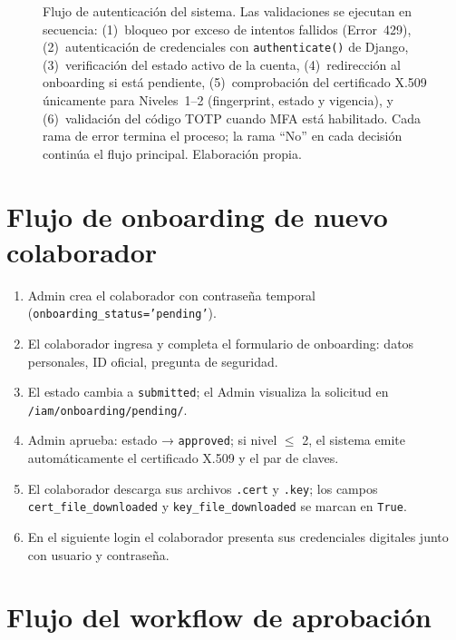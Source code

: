 \documentclass[10pt,letterpaper]{report}
\begin{document}
\begin{figure}[H]
\caption{Flujo de autenticación del sistema. Las validaciones se ejecutan en secuencia: (1)~bloqueo por exceso de intentos fallidos (Error~429), (2)~autenticación de credenciales con \texttt{authenticate()} de Django, (3)~verificación del estado activo de la cuenta, (4)~redirección al onboarding si está pendiente, (5)~comprobación del certificado X.509 únicamente para Niveles~1--2 (fingerprint, estado y vigencia), y (6)~validación del código TOTP cuando MFA está habilitado. Cada rama de error termina el proceso; la rama ``No'' en cada decisión continúa el flujo principal. Elaboración propia.}
\label{fig:flujo_login}
\end{figure}

\section{Flujo de onboarding de nuevo colaborador}

\begin{enumerate}[leftmargin=*]
    \item Admin crea el colaborador con contraseña temporal (\texttt{onboarding\_status='pending'}).
    \item El colaborador ingresa y completa el formulario de onboarding: datos personales, ID oficial, pregunta de seguridad.
    \item El estado cambia a \texttt{submitted}; el Admin visualiza la solicitud en \texttt{/iam/onboarding/pending/}.
    \item Admin aprueba: estado → \texttt{approved}; si nivel $\leq$ 2, el sistema emite automáticamente el certificado X.509 y el par de claves.
    \item El colaborador descarga sus archivos \texttt{.cert} y \texttt{.key}; los campos \texttt{cert\_file\_downloaded} y \texttt{key\_file\_downloaded} se marcan en \texttt{True}.
    \item En el siguiente login el colaborador presenta sus credenciales digitales junto con usuario y contraseña.
\end{enumerate}

\section{Flujo del workflow de aprobación}
\end{document}
